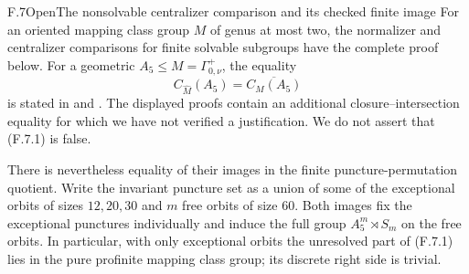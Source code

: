 \begin{claim}{F.7}{Open}{The nonsolvable centralizer comparison and its checked finite image}
For an oriented mapping class group $M$ of genus at most two,
the normalizer and centralizer comparisons for finite solvable
subgroups have the complete proof below. For a geometric
$A_5\le M=\Gamma^+_{0,\nu}$, the equality
\[
                 C_{\widehat M}(A_5)
                    =\overline{C_M(A_5)}                 \tag{F.7.1}
\]
is stated in \cite[Theorem~C(iii)]{R-Boggi} and
\cite[Theorem~5.1(iii)]{R-BZ}. The displayed proofs contain
an additional closure--intersection equality for which we
have not verified a justification. We do not assert that
(F.7.1) is false.

There is nevertheless equality of their images in the
finite puncture-permutation quotient. Write the invariant
puncture set as a union of some of the exceptional orbits
of sizes $12,20,30$ and $m$ free orbits of size $60$.
Both images fix the exceptional punctures individually
and induce the full group $A_5^m\rtimes S_m$ on the
free orbits. In particular, with only exceptional orbits
the unresolved part of (F.7.1) lies in the pure profinite
mapping class group; its discrete right side is trivial.


\end{claim}
